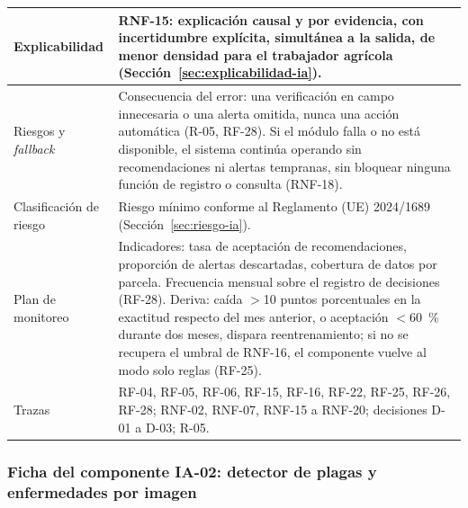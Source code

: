 \documentclass[12pt,a4paper]{article}
\begin{document}
\begin{center}
\begin{longtable}{|p{4.2cm}|p{10cm}|}
\hline
Explicabilidad & RNF-15: explicación causal y por evidencia, con incertidumbre explícita, simultánea a la salida, de menor densidad para el trabajador agrícola (Sección~\ref{sec:explicabilidad-ia}). \\
\hline
Riesgos y \emph{fallback} & Consecuencia del error: una verificación en campo innecesaria o una alerta omitida, nunca una acción automática (R-05, RF-28). Si el módulo falla o no está disponible, el sistema continúa operando sin recomendaciones ni alertas tempranas, sin bloquear ninguna función de registro o consulta (RNF-18). \\
\hline
Clasificación de riesgo & Riesgo mínimo conforme al Reglamento (UE) 2024/1689 (Sección~\ref{sec:riesgo-ia}). \\
\hline
Plan de monitoreo & Indicadores: tasa de aceptación de recomendaciones, proporción de alertas descartadas, cobertura de datos por parcela. Frecuencia mensual sobre el registro de decisiones (RF-28). Deriva: caída $>$10 puntos porcentuales en la exactitud respecto del mes anterior, o aceptación $<$60~\% durante dos meses, dispara reentrenamiento; si no se recupera el umbral de RNF-16, el componente vuelve al modo solo reglas (RF-25). \\
\hline
Trazas & RF-04, RF-05, RF-06, RF-15, RF-16, RF-22, RF-25, RF-26, RF-28; RNF-02, RNF-07, RNF-15 a RNF-20; decisiones D-01 a D-03; R-05. \\
\hline
\end{longtable}
\end{center}

\subsubsection{Ficha del componente IA-02: detector de plagas y enfermedades por imagen}
\label{sec:ficha-ia02}
\end{document}
